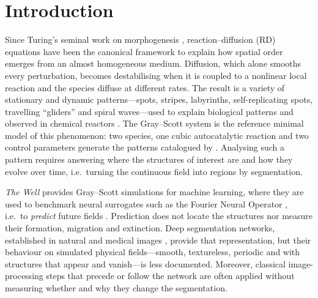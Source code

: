 \documentclass[preprint,12pt,authoryear]{elsarticle}
\begin{document}
\section{Introduction}
\label{sec:intro}

Since Turing's seminal work on morphogenesis \citep{turing1952}, reaction--diffusion (RD) equations have been the canonical framework to explain how spatial order emerges from an almost homogeneous medium. Diffusion, which alone smooths every perturbation, becomes destabilising when it is coupled to a nonlinear local reaction and the species diffuse at different rates. The result is a variety of stationary and dynamic patterns---spots, stripes, labyrinths, self-replicating spots, travelling ``gliders'' and spiral waves---used to explain biological patterns \citep{kondo2010,murray2003} and observed in chemical reactors \citep{lee1993}. The Gray--Scott system \citep{gray1983,gray1984} is the reference minimal model of this phenomenon: two species, one cubic autocatalytic reaction and two control parameters generate the patterns catalogued by \citet{pearson1993}. Analysing such a pattern requires answering where the structures of interest are and how they evolve over time, i.e.\ turning the continuous field into regions by segmentation.

\emph{The Well} \citep{ohana2024well} provides Gray--Scott simulations for machine learning, where they are used to benchmark neural surrogates such as the Fourier Neural Operator \citep{li2021fno}, i.e.\ to \emph{predict} future fields \citep{brunton2020}. Prediction does not locate the structures nor measure their formation, migration and extinction. Deep segmentation networks, established in natural and medical images \citep{long2015fcn,ronneberger2015unet,xie2021segformer,cheng2022mask2former}, provide that representation, but their behaviour on simulated physical fields---smooth, textureless, periodic and with structures that appear and vanish---is less documented. Moreover, classical image-processing steps that precede or follow the network are often applied without measuring whether and why they change the segmentation.
\end{document}
